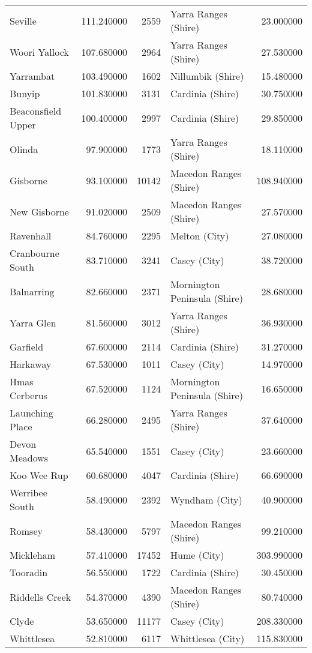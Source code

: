 \begin{longtable}{lrrlr}
Seville & 111.240000 & 2559 & Yarra Ranges (Shire) & 23.000000 \\
Woori Yallock & 107.680000 & 2964 & Yarra Ranges (Shire) & 27.530000 \\
Yarrambat & 103.490000 & 1602 & Nillumbik (Shire) & 15.480000 \\
Bunyip & 101.830000 & 3131 & Cardinia (Shire) & 30.750000 \\
Beaconsfield Upper & 100.400000 & 2997 & Cardinia (Shire) & 29.850000 \\
Olinda & 97.900000 & 1773 & Yarra Ranges (Shire) & 18.110000 \\
Gisborne & 93.100000 & 10142 & Macedon Ranges (Shire) & 108.940000 \\
New Gisborne & 91.020000 & 2509 & Macedon Ranges (Shire) & 27.570000 \\
Ravenhall & 84.760000 & 2295 & Melton (City) & 27.080000 \\
Cranbourne South & 83.710000 & 3241 & Casey (City) & 38.720000 \\
Balnarring & 82.660000 & 2371 & Mornington Peninsula (Shire) & 28.680000 \\
Yarra Glen & 81.560000 & 3012 & Yarra Ranges (Shire) & 36.930000 \\
Garfield & 67.600000 & 2114 & Cardinia (Shire) & 31.270000 \\
Harkaway & 67.530000 & 1011 & Casey (City) & 14.970000 \\
Hmas Cerberus & 67.520000 & 1124 & Mornington Peninsula (Shire) & 16.650000 \\
Launching Place & 66.280000 & 2495 & Yarra Ranges (Shire) & 37.640000 \\
Devon Meadows & 65.540000 & 1551 & Casey (City) & 23.660000 \\
Koo Wee Rup & 60.680000 & 4047 & Cardinia (Shire) & 66.690000 \\
Werribee South & 58.490000 & 2392 & Wyndham (City) & 40.900000 \\
Romsey & 58.430000 & 5797 & Macedon Ranges (Shire) & 99.210000 \\
Mickleham & 57.410000 & 17452 & Hume (City) & 303.990000 \\
Tooradin & 56.550000 & 1722 & Cardinia (Shire) & 30.450000 \\
Riddells Creek & 54.370000 & 4390 & Macedon Ranges (Shire) & 80.740000 \\
Clyde & 53.650000 & 11177 & Casey (City) & 208.330000 \\
Whittlesea & 52.810000 & 6117 & Whittlesea (City) & 115.830000 \\

\end{longtable}
